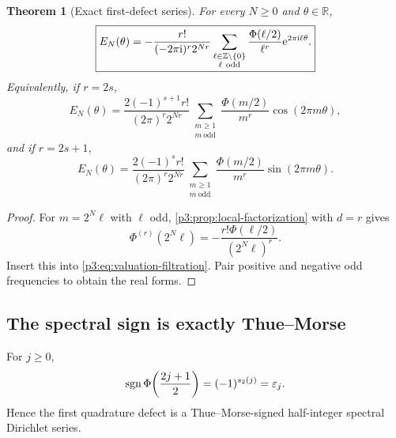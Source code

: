 \documentclass[11pt,oneside]{article}
\numberwithin{equation}{section}
\newtheorem{theorem}{Theorem}[section]
\theoremstyle{definition}
\theoremstyle{remark}
\newcommand{\R}{\mathbb R}
\newcommand{\Z}{\mathbb Z}
\newcommand{\e}{\mathrm e}
\newcommand{\eps}{\varepsilon}
\begin{document}
\begin{theorem}[Exact first-defect series]
\label{p3:thm:first-defect}
For every $N\ge0$ and $\theta\in\R$,
\begin{equation}
 \boxed{\displaystyle
 E_N(\theta)
 =-\frac{r!}{(-2\pi\iu)^r2^{Nr}}
 \sum_{\substack{\ell\in\Z\setminus\{0\}\\\ell\ \mathrm{odd}}}
 \frac{\Phi(\ell/2)}{\ell^r}
 \e^{2\pi\iu\ell\theta}.}
 \label{p3:eq:first-defect-complex}
\end{equation}
Equivalently, if $r=2s$,
\begin{equation}
 E_N(\theta)
 =\frac{2(-1)^{s+1}r!}{(2\pi)^r2^{Nr}}
 \sum_{\substack{m\ge1\\m\ \mathrm{odd}}}
 \frac{\Phi(m/2)}{m^r}\cos(2\pi m\theta),
 \label{p3:eq:first-defect-even}
\end{equation}
and if $r=2s+1$,
\begin{equation}
 E_N(\theta)
 =\frac{2(-1)^sr!}{(2\pi)^r2^{Nr}}
 \sum_{\substack{m\ge1\\m\ \mathrm{odd}}}
 \frac{\Phi(m/2)}{m^r}\sin(2\pi m\theta).
 \label{p3:eq:first-defect-odd}
\end{equation}
\end{theorem}

\begin{proof}
For $m=2^N\ell$ with $\ell$ odd, \cref{p3:prop:local-factorization} with $d=r$ gives
\begin{equation}
 \Phi^{(r)}(2^N\ell)
 =-\frac{r!\Phi(\ell/2)}{(2^N\ell)^r}.
 \label{p3:eq:first-zero-jet}
\end{equation}
Insert this into \eqref{p3:eq:valuation-filtration}.  Pair positive and negative odd frequencies to obtain the real forms.
\end{proof}

\subsection{The spectral sign is exactly Thue--Morse}

\begin{proposition}
\label{p3:prop:half-integer-sign}
For $j\ge0$,
\begin{equation}
 \sgn\Phi\!\left(\frac{2j+1}{2}\right)
 =(-1)^{s_2(j)}=\eps_j.
 \label{p3:eq:half-integer-sign}
\end{equation}
Hence the first quadrature defect is a Thue--Morse-signed half-integer spectral Dirichlet series.
\end{proposition}
\end{document}
